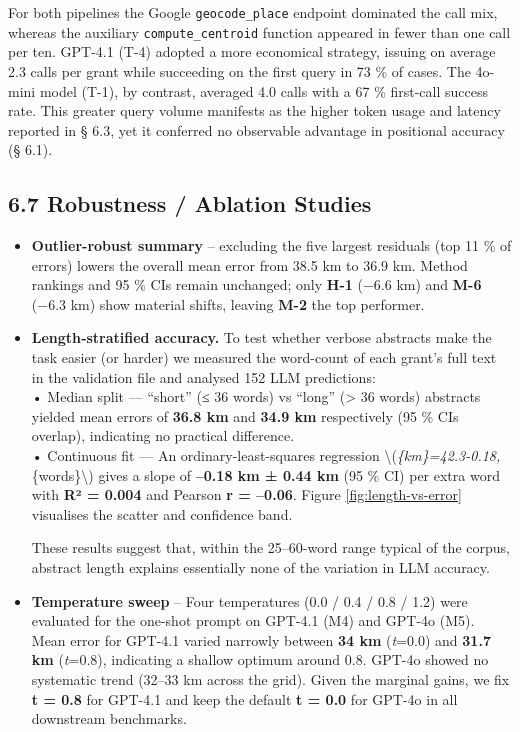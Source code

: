 \documentclass[
  11pt,
]{article}
\begin{document}
For both pipelines the Google \texttt{geocode\_place} endpoint dominated
the call mix, whereas the auxiliary \texttt{compute\_centroid} function
appeared in fewer than one call per ten. GPT-4.1 (T-4) adopted a more
economical strategy, issuing on average 2.3 calls per grant while
succeeding on the first query in 73 \% of cases. The 4o-mini model
(T-1), by contrast, averaged 4.0 calls with a 67 \% first-call success
rate. This greater query volume manifests as the higher token usage and
latency reported in § 6.3, yet it conferred no observable advantage in
positional accuracy (§ 6.1).

\subsection{6.7 Robustness / Ablation
Studies}\label{robustness-ablation-studies}

\begin{itemize}
\item
  \textbf{Outlier-robust summary} -- excluding the five largest
  residuals (top 11 \% of errors) lowers the overall mean error from
  38.5 km to 36.9 km. Method rankings and 95 \% CIs remain unchanged;
  only \textbf{H-1} (−6.6 km) and \textbf{M-6} (−6.3 km) show material
  shifts, leaving \textbf{M-2} the top performer.
\item
  \textbf{Length‐stratified accuracy.} To test whether verbose abstracts
  make the task easier (or harder) we measured the word-count of each
  grant's full text in the validation file and analysed 152 LLM
  predictions:\\
  • Median split --- ``short'' (≤ 36 words) vs ``long'' (\textgreater{}
  36 words) abstracts yielded mean errors of \textbf{36.8 km} and
  \textbf{34.9 km} respectively (95 \% CIs overlap), indicating no
  practical difference.\\
  • Continuous fit --- An ordinary-least-squares regression
  \textbackslash(\emph{\{km\}=42.3-0.18,}\{words\}\textbackslash)
  gives a slope of \textbf{--0.18 km ± 0.44 km} (95 \% CI) per extra
  word with \textbf{R² = 0.004} and Pearson \textbf{r = --0.06}. Figure
  \autoref{fig:length-vs-error} visualises the scatter and confidence
  band.

  These results suggest that, within the 25--60-word range typical of
  the corpus, abstract length explains essentially none of the variation
  in LLM accuracy.
\item
  \textbf{Temperature sweep} -- Four temperatures (0.0 / 0.4 / 0.8 /
  1.2) were evaluated for the one-shot prompt on GPT-4.1 (M4) and GPT-4o
  (M5). Mean error for GPT-4.1 varied narrowly between \textbf{34 km}
  (\emph{t}=0.0) and \textbf{31.7 km} (\emph{t}=0.8), indicating a
  shallow optimum around 0.8. GPT-4o showed no systematic trend (32--33
  km across the grid). Given the marginal gains, we fix \textbf{t = 0.8}
  for GPT-4.1 and keep the default \textbf{t = 0.0} for GPT-4o in all
  downstream benchmarks.
\end{itemize}
\end{document}
